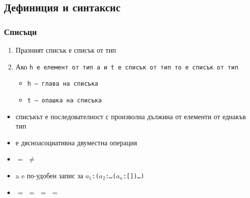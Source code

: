\documentclass[alsotrans]{beamerswitch}
\begin{document}
\subsection{Дефиниция и синтаксис}


\begin{frame}
  \frametitle{Списъци}

  \begin{definition}
    \begin{enumerate}
    \item Празният списък \lst{[]} е списък от тип \lst{[a]}
    \item Ако \tt h е елемент от тип \tt a и \tt t е списък от тип \lst{[a]} то  е списък от тип \lst{[a]}
      \begin{itemize}
      \item \tt h --- глава на списъка
      \item \tt t --- опашка на списъка
      \end{itemize}
    \end{enumerate}
  \end{definition}
  \onslide<+->
  \begin{itemize}[<+->]
  \item списъкът е последователност с \alert{произволна дължина} от елементи от \alert{еднакъв тип}
  \item {}  е \alert{дясноасоциативна} двуместна операция
  \item {} $=$  $\neq$ 
  \item \hlist a e по-удобен запис за $a_1$\tt{:(}$a_2$\tt:\ldots($a_n$\tt{:[])}\ldots\tt)
  \item \lst{[1,2,3,4]} $=$  $=$  $=$  $=$ \
  \end{itemize}
\end{frame}
\end{document}
